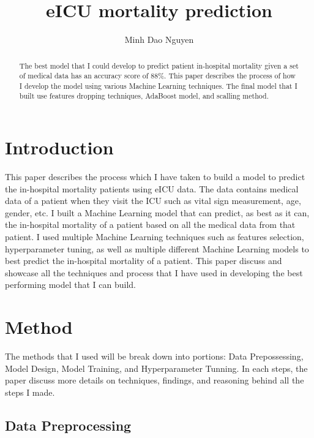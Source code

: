 \documentclass{article}
\title{eICU mortality prediction}
\author{%
  Minh Dao Nguyen \\
}
\begin{document}
\maketitle


\begin{abstract}
  The best model that I could develop to predict patient in-hospital mortality given a set of medical data has an accuracy score of 88\%. This paper describes the process of how I develop the model using various Machine Learning techniques. The final model that I built use features dropping techniques, AdaBoost model, and scalling method.  
\end{abstract}

\section{Introduction}

This paper describes the process which I have taken to build a model to predict the in-hospital mortality patients using eICU data. The data contains medical data of a patient when they visit the ICU such as vital sign measurement, age, gender, etc. I built a Machine Learning model that can predict, as best as it can, the in-hospital mortality of a patient based on all the medical data from that patient. I used multiple Machine Learning techniques such as features selection, hyperparameter tuning, as well as multiple different Machine Learning models to best predict the in-hospital mortality of a patient. This paper discuss and showcase all the techniques and process that I have used in developing the best performing model that I can build. 
\section{Method}

The methods that I used will be break down into portions: Data Prepossessing, Model Design, Model Training, and Hyperparameter Tunning. In each steps, the paper discuss more details on techniques, findings, and reasoning behind all the steps I made.
\subsection{Data Preprocessing}
\end{document}
